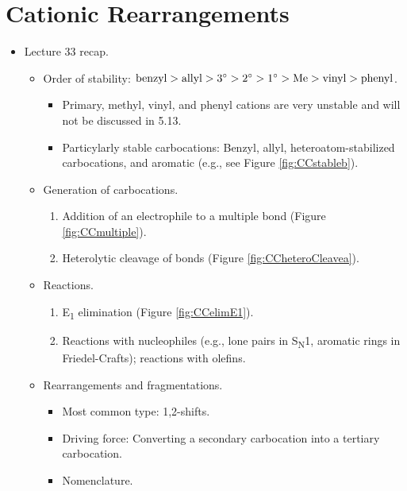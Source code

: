 \documentclass[../notes.tex]{subfiles}
\begin{document}
\section{Cationic Rearrangements}
\begin{itemize}
    \item {}Lecture 33 recap.
    \begin{itemize}
        \item Order of stability: $
            \text{benzyl} > \text{allyl} > 3^\circ > 2^\circ > 1^\circ > \ce{Me} > \text{vinyl} > \text{phenyl}
        $.
        \begin{itemize}
            \item Primary, methyl, vinyl, and phenyl cations are very unstable and will not be discussed in 5.13.
            \item Particylarly stable carbocations: Benzyl, allyl, heteroatom-stabilized carbocations, and aromatic (e.g., see Figure \ref{fig:CCstableb}).
        \end{itemize}
        \item Generation of carbocations.
        \begin{enumerate}[label={\arabic*)}]
            \item Addition of an electrophile to a multiple bond (Figure \ref{fig:CCmultiple}).
            \item Heterolytic cleavage of  bonds (Figure \ref{fig:CCheteroCleavea}).
        \end{enumerate}
        \item Reactions.
        \begin{enumerate}[label={\arabic*)}]
            \item E\textsubscript{1} elimination (Figure \ref{fig:CCelimE1}).
            \item Reactions with nucleophiles (e.g., lone pairs in S\textsubscript{N}1, aromatic rings in Friedel-Crafts); reactions with olefins.
        \end{enumerate}
        \item Rearrangements and fragmentations.
        \begin{itemize}
            \item Most common type: 1,2-shifts.
            \item Driving force: Converting a secondary carbocation into a tertiary carbocation.
            \item Nomenclature.
            \begin{itemize}

\end{itemize}
\end{itemize}
\end{itemize}
\end{itemize}
\end{document}
